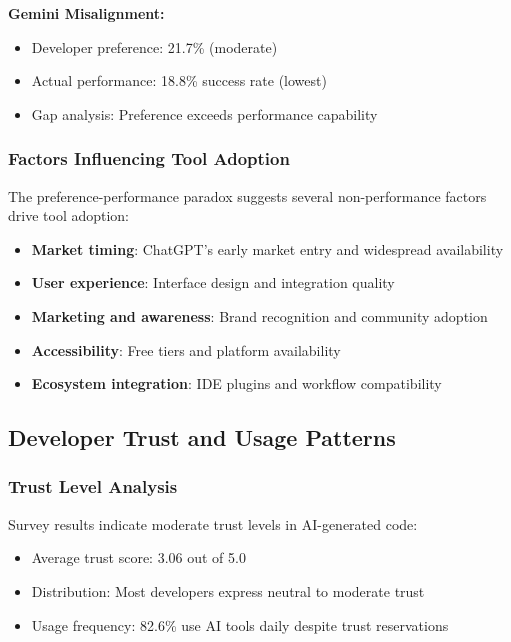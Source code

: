 \documentclass[conference]{IEEEtran}
\begin{document}
\textbf{Gemini Misalignment:}
\begin{itemize}
    \item Developer preference: 21.7\% (moderate)
    \item Actual performance: 18.8\% success rate (lowest)
    \item Gap analysis: Preference exceeds performance capability
\end{itemize}

\subsubsection{Factors Influencing Tool Adoption}

The preference-performance paradox suggests several non-performance factors drive tool adoption:

\begin{itemize}
    \item \textbf{Market timing}: ChatGPT's early market entry and widespread availability
    \item \textbf{User experience}: Interface design and integration quality
    \item \textbf{Marketing and awareness}: Brand recognition and community adoption
    \item \textbf{Accessibility}: Free tiers and platform availability
    \item \textbf{Ecosystem integration}: IDE plugins and workflow compatibility
\end{itemize}

\subsection{Developer Trust and Usage Patterns}

\subsubsection{Trust Level Analysis}

Survey results indicate moderate trust levels in AI-generated code:

\begin{itemize}
    \item Average trust score: 3.06 out of 5.0
    \item Distribution: Most developers express neutral to moderate trust
    \item Usage frequency: 82.6\% use AI tools daily despite trust reservations
\end{itemize}
\end{document}
